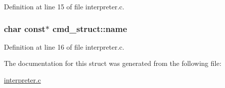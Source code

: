 Definition at line 15 of file interpreter.\-c.

\hypertarget{structcmd__struct_a35071dc464890b0c7aa50fa6d8cab54c}{
\subsubsection[{name}]{\setlength{\rightskip}{0pt plus 5cm}char const$\ast$ cmd\-\_\-struct\-::name}}\label{structcmd__struct_a35071dc464890b0c7aa50fa6d8cab54c}


Definition at line 16 of file interpreter.\-c.



The documentation for this struct was generated from the following file\-:\begin{DoxyCompactItemize}
\item 
\hyperlink{interpreter_8c}{interpreter.\-c}\end{DoxyCompactItemize}
